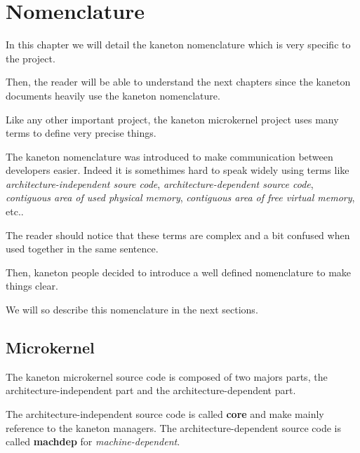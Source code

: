 
%
%

\chapter{Nomenclature}

In this chapter we will detail the kaneton nomenclature which is very
specific to the project.

Then, the reader will be able to understand the next chapters since the
kaneton documents heavily use the kaneton nomenclature.

\newpage

%
%

Like any other important project, the kaneton microkernel project
uses many terms to define very precise things.

The kaneton nomenclature was introduced to make communication between
developers easier. Indeed it is somethimes hard to speak widely using
terms like \textit{architecture-independent soure code},
\textit{architecture-dependent source code},
\textit{contiguous area of used physical memory},
\textit{contiguous area of free virtual memory}, etc..

The reader should notice that these terms are complex and a bit confused
when used together in the same sentence.

Then, kaneton people decided to introduce a well defined nomenclature
to make things clear.

We will so describe this nomenclature in the next sections.

%
%

\section{Microkernel}

The kaneton microkernel source code is composed of two majors parts, the
architecture-independent part and the architecture-dependent part.

The architecture-independent source code is called \textbf{core} and
make mainly reference to the kaneton managers. The architecture-dependent
source code is called \textbf{machdep} for \textit{machine-dependent}.

